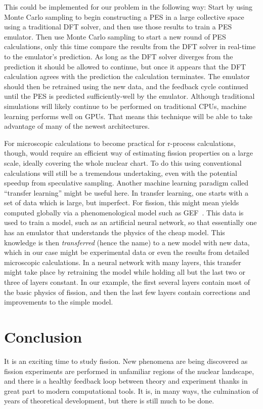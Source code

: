 This could be implemented for our problem in the following way: Start by using Monte Carlo sampling to begin constructing a PES in a large collective space using a traditional DFT solver, and then use those results to train a PES emulator. Then use Monte Carlo sampling to start a new round of PES calculations, only this time compare the results from the DFT solver in real-time to the emulator's prediction. As long as the DFT solver diverges from the prediction it should be allowed to continue, but once it appears that the DFT calculation agrees with the prediction the calculation terminates. The emulator should then be retrained using the new data, and the feedback cycle continued until the PES is predicted sufficiently-well by the emulator. Although traditional simulations will likely continue to be performed on traditional CPUs, machine learning performs well on GPUs. That means this technique will be able to take advantage of many of the newest architectures.

For microscopic calculations to become practical for r-process calculations, though, would require an efficient way of estimating fission properties on a large scale, ideally covering the whole nuclear chart. To do this using conventional calculations will still be a tremendous undertaking, even with the potential speedup from speculative sampling. Another machine learning paradigm called ``transfer learning'' might be useful here. In transfer learning, one starts with a set of data which is large, but imperfect. For fission, this might mean yields computed globally via a phenomenological model such as GEF~\cite{Schmidt2016}. This data is used to train a model, such as an artificial neural network, so that essentially one has an emulator that understands the physics of the cheap model. This knowledge is then \textit{transferred} (hence the name) to a new model with new data, which in our case might be experimental data or even the results from detailed microscopic calculations. In a neural network with many layers, this transfer might take place by retraining the model while holding all but the last two or three of layers constant. In our example, the first several layers contain most of the basic physics of fission, and then the last few layers contain corrections and improvements to the simple model.


\section{Conclusion}
It is an exciting time to study fission. New phenomena are being discovered as fission experiments are performed in unfamiliar regions of the nuclear landscape, and there is a healthy feedback loop between theory and experiment thanks in great part to modern computational tools. It is, in many ways, the culmination of years of theoretical development, but there is still much to be done.